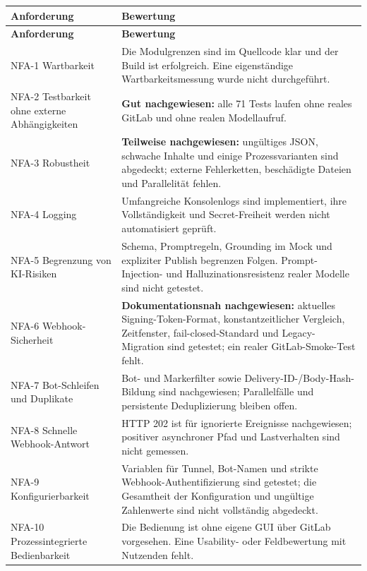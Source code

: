 \begin{longtable}{@{}>{\raggedright\arraybackslash}p{}>{\raggedright\arraybackslash}p{}@{}}
\toprule
\textbf{Anforderung} & \textbf{Bewertung} \\
\midrule
\endfirsthead
\toprule
\textbf{Anforderung} & \textbf{Bewertung} \\
\midrule
\endhead
NFA-1 Wartbarkeit & Die Modulgrenzen sind im Quellcode klar und der Build ist erfolgreich. Eine eigenständige Wartbarkeitsmessung wurde nicht durchgeführt. \\
NFA-2 Testbarkeit ohne externe Abhängigkeiten & \textbf{Gut nachgewiesen:} alle 71 Tests laufen ohne reales GitLab und ohne realen Modellaufruf. \\
NFA-3 Robustheit & \textbf{Teilweise nachgewiesen:} ungültiges JSON, schwache Inhalte und einige Prozessvarianten sind abgedeckt; externe Fehlerketten, beschädigte Dateien und Parallelität fehlen. \\
NFA-4 Logging & Umfangreiche Konsolenlogs sind implementiert, ihre Vollständigkeit und Secret-Freiheit werden nicht automatisiert geprüft. \\
NFA-5 Begrenzung von KI-Risiken & Schema, Promptregeln, Grounding im Mock und expliziter Publish begrenzen Folgen. Prompt-Injection- und Halluzinationsresistenz realer Modelle sind nicht getestet. \\
NFA-6 Webhook-Sicherheit & \textbf{Dokumentationsnah nachgewiesen:} aktuelles Signing-Token-Format, konstantzeitlicher Vergleich, Zeitfenster, fail-closed-Standard und Legacy-Migration sind getestet; ein realer GitLab-Smoke-Test fehlt. \\
NFA-7 Bot-Schleifen und Duplikate & Bot- und Markerfilter sowie Delivery-ID-/Body-Hash-Bildung sind nachgewiesen; Parallelfälle und persistente Deduplizierung bleiben offen. \\
NFA-8 Schnelle Webhook-Antwort & HTTP 202 ist für ignorierte Ereignisse nachgewiesen; positiver asynchroner Pfad und Lastverhalten sind nicht gemessen. \\
NFA-9 Konfigurierbarkeit & Variablen für Tunnel, Bot-Namen und strikte Webhook-Authentifizierung sind getestet; die Gesamtheit der Konfiguration und ungültige Zahlenwerte sind nicht vollständig abgedeckt. \\
NFA-10 Prozessintegrierte Bedienbarkeit & Die Bedienung ist ohne eigene GUI über GitLab vorgesehen. Eine Usability- oder Feldbewertung mit Nutzenden fehlt. \\
\bottomrule
\end{longtable}

